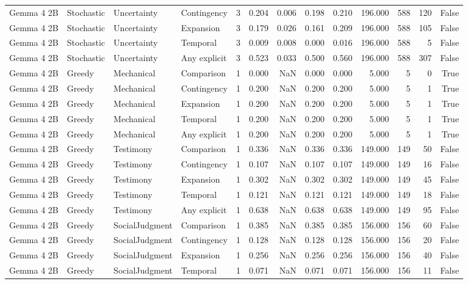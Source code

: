 \begin{tabular}{llllrrrrrrrrr}
Gemma 4 2B & Stochastic & Uncertainty & Contingency & 3 & 0.204 & 0.006 & 0.198 & 0.210 & 196.000 & 588 & 120 & False \\
Gemma 4 2B & Stochastic & Uncertainty & Expansion & 3 & 0.179 & 0.026 & 0.161 & 0.209 & 196.000 & 588 & 105 & False \\
Gemma 4 2B & Stochastic & Uncertainty & Temporal & 3 & 0.009 & 0.008 & 0.000 & 0.016 & 196.000 & 588 & 5 & False \\
Gemma 4 2B & Stochastic & Uncertainty & Any explicit & 3 & 0.523 & 0.033 & 0.500 & 0.560 & 196.000 & 588 & 307 & False \\
Gemma 4 2B & Greedy & Mechanical & Comparison & 1 & 0.000 & NaN & 0.000 & 0.000 & 5.000 & 5 & 0 & True \\
Gemma 4 2B & Greedy & Mechanical & Contingency & 1 & 0.200 & NaN & 0.200 & 0.200 & 5.000 & 5 & 1 & True \\
Gemma 4 2B & Greedy & Mechanical & Expansion & 1 & 0.200 & NaN & 0.200 & 0.200 & 5.000 & 5 & 1 & True \\
Gemma 4 2B & Greedy & Mechanical & Temporal & 1 & 0.200 & NaN & 0.200 & 0.200 & 5.000 & 5 & 1 & True \\
Gemma 4 2B & Greedy & Mechanical & Any explicit & 1 & 0.200 & NaN & 0.200 & 0.200 & 5.000 & 5 & 1 & True \\
Gemma 4 2B & Greedy & Testimony & Comparison & 1 & 0.336 & NaN & 0.336 & 0.336 & 149.000 & 149 & 50 & False \\
Gemma 4 2B & Greedy & Testimony & Contingency & 1 & 0.107 & NaN & 0.107 & 0.107 & 149.000 & 149 & 16 & False \\
Gemma 4 2B & Greedy & Testimony & Expansion & 1 & 0.302 & NaN & 0.302 & 0.302 & 149.000 & 149 & 45 & False \\
Gemma 4 2B & Greedy & Testimony & Temporal & 1 & 0.121 & NaN & 0.121 & 0.121 & 149.000 & 149 & 18 & False \\
Gemma 4 2B & Greedy & Testimony & Any explicit & 1 & 0.638 & NaN & 0.638 & 0.638 & 149.000 & 149 & 95 & False \\
Gemma 4 2B & Greedy & SocialJudgment & Comparison & 1 & 0.385 & NaN & 0.385 & 0.385 & 156.000 & 156 & 60 & False \\
Gemma 4 2B & Greedy & SocialJudgment & Contingency & 1 & 0.128 & NaN & 0.128 & 0.128 & 156.000 & 156 & 20 & False \\
Gemma 4 2B & Greedy & SocialJudgment & Expansion & 1 & 0.256 & NaN & 0.256 & 0.256 & 156.000 & 156 & 40 & False \\
Gemma 4 2B & Greedy & SocialJudgment & Temporal & 1 & 0.071 & NaN & 0.071 & 0.071 & 156.000 & 156 & 11 & False \\

\end{tabular}
